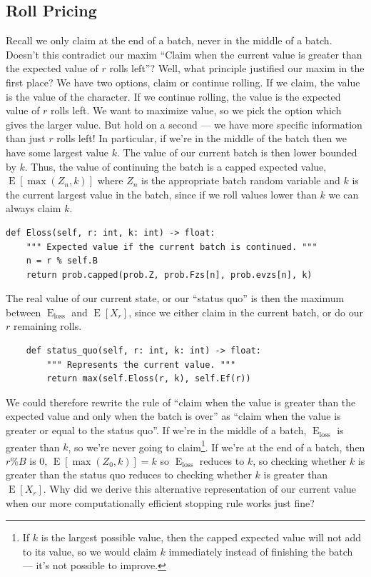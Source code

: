 \documentclass[11pt, oneside]{article}
\DeclareMathOperator{\E}{E}
\theoremstyle{plain}
\theoremstyle{definition}
\begin{document}
\subsection{Roll Pricing} \label{subsec:price}
Recall we only claim at the end of a batch, never in the middle of a batch.
Doesn't this contradict our maxim \enquote{Claim when the current value is
greater than the expected value of \( r \) rolls left}? Well, what principle
justified our maxim in the first place? We have two options, claim or continue
rolling. If we claim, the value is the value of the character. If we continue
rolling, the value is the expected value of \( r \) rolls left. We want to
maximize value, so we pick the option which gives the larger value. But hold on
a second --- we have more specific information than just \( r \) rolls left!
In particular, if we're in the middle of the batch then we have some largest
value \( k \). The value of our current batch is then lower bounded by \( k
\). Thus, the value of continuing the batch is a capped expected value, \(
\E[\max(Z_n, k)] \) where \( Z_n \) is the appropriate batch random variable
and \( k \) is the current largest value in the batch, since if we roll values
lower than \( k \) we can always claim \( k \).
\begin{verbatim}
def Eloss(self, r: int, k: int) -> float:
    """ Expected value if the current batch is continued. """
    n = r % self.B
    return prob.capped(prob.Z, prob.Fzs[n], prob.evzs[n], k)
\end{verbatim}

The real value of our current state, or our \enquote{status quo} is then
the maximum between \( \E_{\text{loss}} \) and \( \E[X_r] \), since we
either claim in the current batch, or do our \( r \) remaining rolls.
\begin{verbatim}
    def status_quo(self, r: int, k: int) -> float:
        """ Represents the current value. """
        return max(self.Eloss(r, k), self.Ef(r))
\end{verbatim}

We could therefore rewrite the rule of \enquote{claim when the value is greater
than the expected value and only when the batch is over} as \enquote{claim when
the value is greater or equal to the status quo}. If we're in the middle of a
batch, \( \E_{\text{loss}} \) is greater than \( k \), so we're never going
to claim\footnote{If \( k \) is the largest possible value, then the capped
expected value will not add to its value, so we would claim \( k \) immediately
instead of finishing the batch --- it's not possible to improve.}. If we're at
the end of a batch, then \( r \% B \) is 0, \( \E[\max(Z_0, k)] = k \) so \(
\E_{\text{loss}} \) reduces to \( k \), so checking whether \( k \) is greater
than the status quo reduces to checking whether \( k \) is greater than \(
\E[X_r] \). Why did we derive this alternative representation of our current
value when our more computationally efficient stopping rule works just fine?
\end{document}
